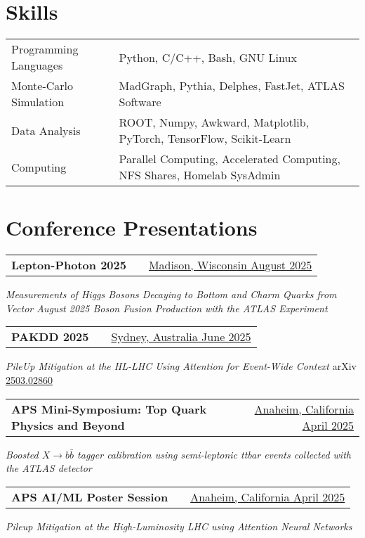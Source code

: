 \documentclass[a4paper,12pt]{article}
\makeatletter
\newenvironment{jobshort}[2]
    {
    \begin{tabularx}{\linewidth}{@{}l X r@{}}
    \textbf{#1} & \hfill &  #2 \\[3.75pt]
    \end{tabularx}
    }
    {
    }
\makeatother
\begin{document}
\section{Skills}
\begin{tabularx}{\linewidth}{@{}l X@{}}
Programming Languages &  \normalsize{Python, C/C++, Bash, GNU Linux}\\
Monte-Carlo Simulation &  \normalsize{MadGraph, Pythia, Delphes, FastJet, ATLAS Software}\\
Data Analysis &  \normalsize{ROOT, Numpy, Awkward, Matplotlib, PyTorch, TensorFlow, Scikit-Learn}\\
Computing &  \normalsize{Parallel Computing, Accelerated Computing, NFS Shares, Homelab SysAdmin}\\
\end{tabularx}

\section{Conference Presentations}
\begin{jobshort}{Lepton-Photon 2025}{\href{https://indico.cern.ch/event/1493037/timetable/?view=standard\#54-measurements-of-higgs-boson}{Madison, Wisconsin August 2025}}
\textit{Measurements of Higgs Bosons Decaying to Bottom and Charm Quarks from Vector August 2025 Boson Fusion Production with the ATLAS Experiment}
\end{jobshort}

\begin{jobshort}{PAKDD 2025}{\href{https://pakdd2025.org/detailed-program/day-2/}{Sydney, Australia June 2025}}
\textit{PileUp Mitigation at the HL-LHC Using Attention for Event-Wide Context} arXiv \href{https://arxiv.org/abs/2503.02860}{2503.02860}
\end{jobshort}

\begin{jobshort}{APS Mini-Symposium: Top Quark Physics and Beyond}{\href{https://schedule.aps.org/smt/2025/events/APR-G10}{Anaheim, California April 2025}}
\textit{Boosted $X\rightarrow b\bar{b}$ tagger calibration using semi-leptonic ttbar events collected with the ATLAS detector}
\end{jobshort}

\begin{jobshort}{APS AI/ML Poster Session}{\href{https://schedule.aps.org/smt/2025/events/MAR-H00/323}{Anaheim, California April 2025}}
\textit{Pileup Mitigation at the High-Luminosity LHC using Attention Neural Networks}
\end{jobshort}
\end{document}
